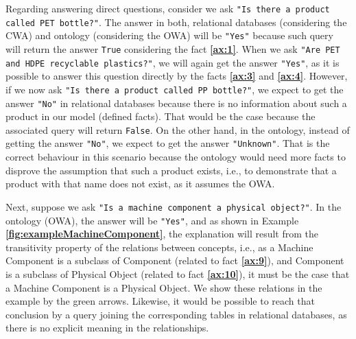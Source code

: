 \documentclass{guideline/sty/rapport}
\begin{document}
Regarding answering direct questions, consider we ask  \colorbox{arsenic!20}{\texttt{"Is there a product called PET bottle?"}}. The answer in both, relational databases (considering the \ac{CWA}) and ontology (considering the \ac{OWA}) will be \colorbox{junglegreen!50}{\texttt{"Yes"}} because such query will return the answer \colorbox{junglegreen!50}{\texttt{True}} considering the fact \textbf{\ref{ax:1}}. When we ask \colorbox{arsenic!20}{\texttt{"Are PET and HDPE recyclable plastics?"}}, we will again get the answer \colorbox{junglegreen!50}{\texttt{"Yes"}}, as it is possible to answer this question directly by the facts \textbf{\ref{ax:3}} and \textbf{\ref{ax:4}}. However, if we now ask \colorbox{arsenic!20}{\texttt{"Is there a product called PP bottle?"}}, we expect to get the answer \colorbox{pastelred!50}{\texttt{"No"}} in relational databases because there is no information about such a product in our model (defined facts). That would be the case because the associated query will return \colorbox{pastelred!50}{\texttt{False}}. On the other hand, in the ontology, instead of getting the answer \colorbox{pastelred!50}{\texttt{"No"}}, we expect to get the answer \colorbox{bananamania}{\texttt{"Unknown"}}. That is the correct behaviour in this scenario because the ontology would need more facts to disprove the assumption that such a product exists, i.e., to demonstrate that a product with that name does not exist, as it assumes the \ac{OWA}. 
\singlespacing

Next, suppose we ask \colorbox{arsenic!20}{\texttt{"Is a machine component a physical object?"}}. In the ontology (\ac{OWA}), the answer will be \colorbox{junglegreen!50}{\texttt{"Yes"}}, and as shown in Example \textbf{\ref{fig:exampleMachineComponent}}, the explanation will result from the transitivity property of the relations between concepts, i.e., as a Machine Component is a subclass of Component (related to fact \textbf{\ref{ax:9}}), and Component is a subclass of Physical Object (related to fact \textbf{ \ref{ax:10}}), it must be the case that a Machine Component is a Physical Object. We show these relations in the example by the green arrows. Likewise, it would be possible to reach that conclusion by a query joining the corresponding tables in relational databases, as there is no explicit meaning in the relationships.
\end{document}
